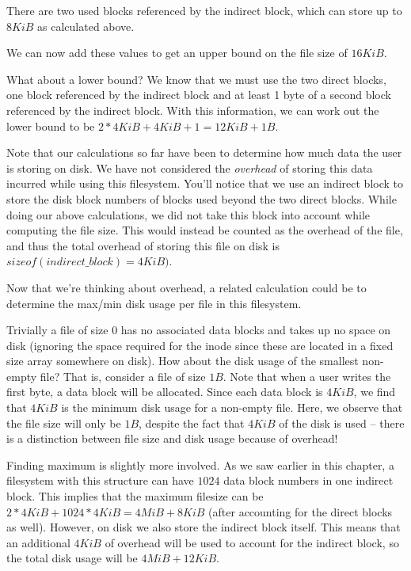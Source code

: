 There are two used blocks referenced by the indirect block, which can store up to $8KiB$ as calculated above.

We can now add these values to get an upper bound on the file size of $16KiB$.

What about a lower bound? We know that we must use the two direct blocks, one block referenced by the indirect block and at least 1 byte of a
second block referenced by the indirect block.
With this information, we can work out the lower bound to be $2*4KiB+4KiB+1=12KiB+1B$.

Note that our calculations so far have been to determine how much data the user is storing on disk.
We have not considered the \textit{overhead} of storing this data incurred while using this filesystem.
You'll notice that we use an indirect block to store the disk block numbers of blocks used beyond the two direct blocks.
While doing our above calculations, we did not take this block into account while computing the file size.
This would instead be counted as the overhead of the file, and thus the total overhead of storing this file on disk is $sizeof(indirect\_block)=4KiB)$.

Now that we're thinking about overhead, a related calculation could be to determine the max/min disk usage per file in this filesystem.

Trivially a file of size $0$ has no associated data blocks and takes up no space on disk (ignoring the space required for the inode since these are located in a fixed size array somewhere on disk).
How about the disk usage of the smallest non-empty file? That is, consider a file of size $1B$.
Note that when a user writes the first byte, a data block will be allocated.
Since each data block is $4KiB$, we find that $4KiB$ is the minimum disk usage for a non-empty file.
Here, we observe that the file size will only be $1B$, despite the fact that $4KiB$ of the disk is used -- there is a distinction between file size and disk usage because of overhead!

Finding maximum is slightly more involved.
As we saw earlier in this chapter, a filesystem with this structure can have $1024$ data block numbers in one indirect block.
This implies that the maximum filesize can be $2*4KiB + 1024*4KiB = 4MiB + 8KiB$ (after accounting for the direct blocks as well).
However, on disk we also store the indirect block itself.
This means that an additional $4KiB$ of overhead will be used to account for the indirect block, so the total disk usage will be $4MiB + 12KiB$.

